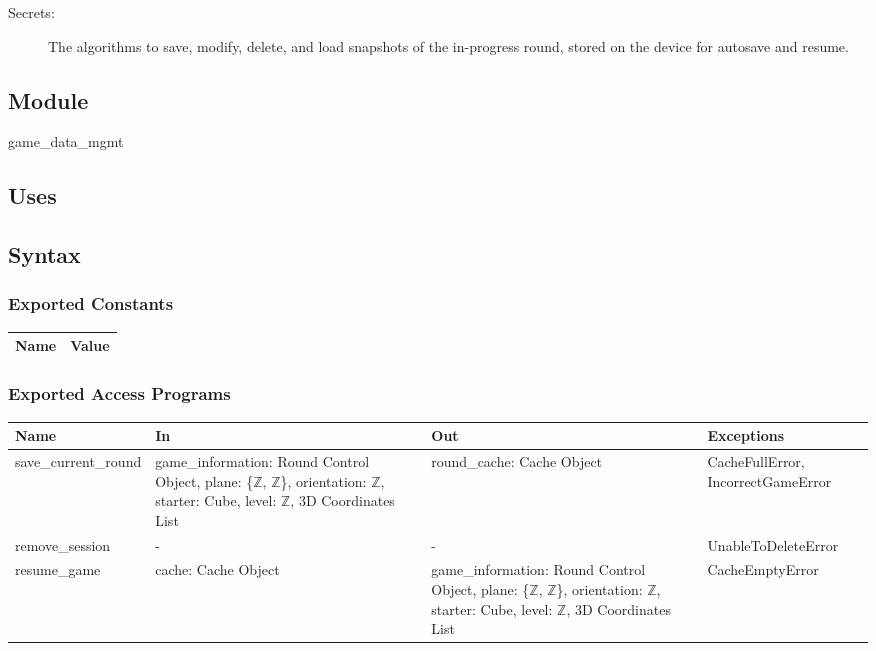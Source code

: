 \documentclass[12pt, titlepage]{article}
\begin{document}
\begin{description}
\item[Secrets:] The algorithms to save, modify, delete, and load snapshots of the in-progress round, stored on the device for autosave and resume.
\end{description}

\subsection{Module}

game\_data\_mgmt

\subsection{Uses}


\subsection{Syntax}

\subsubsection{Exported Constants}

\begin{center}
\begin{tabular}{p{10cm} p{4cm}}
\hline
\textbf{Name} & \textbf{Value}\\
\hline


\hline
\end{tabular}
\end{center}

\subsubsection{Exported Access Programs}

\begin{center}
\begin{tabular}{p{4cm} p{4cm} p{4cm} p{4cm}}
\hline
\textbf{Name} & \textbf{In} & \textbf{Out} & \textbf{Exceptions} \\
\hline
save\_current\_round & game\_information: Round Control Object, plane: \{$\mathbb{Z}$, $\mathbb{Z}$\}, orientation: $\mathbb{Z}$, starter: Cube, level: $\mathbb{Z}$, 3D Coordinates List  & round\_cache: Cache Object & CacheFullError, IncorrectGameError \\
remove\_session & - & - & UnableToDeleteError \\
resume\_game & cache: Cache Object & game\_information: Round Control Object, plane: \{$\mathbb{Z}$, $\mathbb{Z}$\}, orientation: $\mathbb{Z}$, starter: Cube, level: $\mathbb{Z}$, 3D Coordinates List & CacheEmptyError \\
\hline
\end{tabular}
\end{center}
\end{document}

